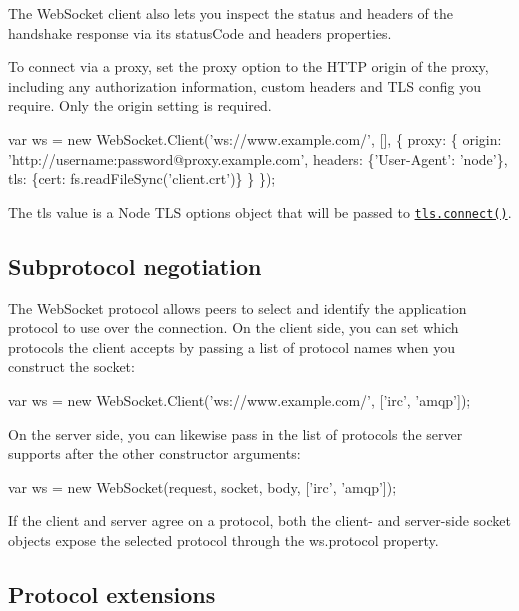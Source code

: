 The Web\+Socket client also lets you inspect the status and headers of the handshake response via its {\ttfamily status\+Code} and {\ttfamily headers} properties.

To connect via a proxy, set the {\ttfamily proxy} option to the H\+T\+TP origin of the proxy, including any authorization information, custom headers and T\+LS config you require. Only the {\ttfamily origin} setting is required.


\begin{DoxyCode}
var ws = new WebSocket.Client('ws://www.example.com/', [], \{
  proxy: \{
    origin:  'http://username:password@proxy.example.com',
    headers: \{'User-Agent': 'node'\},
    tls:     \{cert: fs.readFileSync('client.crt')\}
  \}
\});
\end{DoxyCode}


The {\ttfamily tls} value is a Node \textquotesingle{}T\+LS options\textquotesingle{} object that will be passed to \href{http://nodejs.org/api/tls.html#tls_tls_connect_options_callback}{\tt {\ttfamily tls.\+connect()}}.

\subsection*{Subprotocol negotiation}

The Web\+Socket protocol allows peers to select and identify the application protocol to use over the connection. On the client side, you can set which protocols the client accepts by passing a list of protocol names when you construct the socket\+:


\begin{DoxyCode}
var ws = new WebSocket.Client('ws://www.example.com/', ['irc', 'amqp']);
\end{DoxyCode}


On the server side, you can likewise pass in the list of protocols the server supports after the other constructor arguments\+:


\begin{DoxyCode}
var ws = new WebSocket(request, socket, body, ['irc', 'amqp']);
\end{DoxyCode}


If the client and server agree on a protocol, both the client-\/ and server-\/side socket objects expose the selected protocol through the {\ttfamily ws.\+protocol} property.

\subsection*{Protocol extensions}

